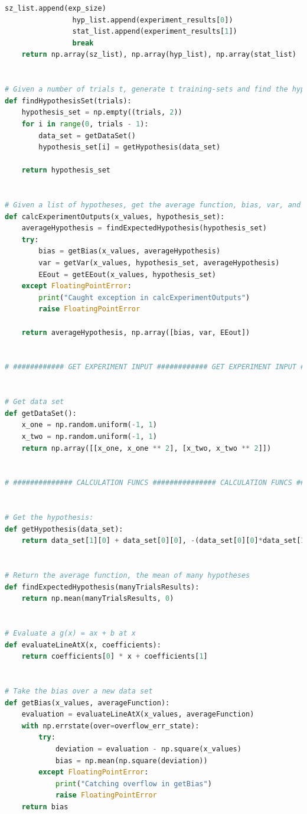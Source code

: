 \documentclass[12pt]{article}
\begin{document}
\begin{lstlisting}[language=Python, caption=experiement\_funcs.py]
                sz_list.append(exp_size)
                hyp_list.append(experiment_results[0])
                stat_list.append(experiment_results[1])
                break
    return np.array(sz_list), np.array(hyp_list), np.array(stat_list)


# Given a number of trials t, generate t training-sets and find the hypothesis for each one
def findHypothesisSet(trials):
    hypothesis_set = np.empty((trials, 2))
    for i in range(0, trials - 1):
        data_set = getDataSet()
        hypothesis_set[i] = getHypothesis(data_set)

    return hypothesis_set


# Given a list of hypotheses, get the average function, bias, var, and two versions of E[E_out]
def calcExperimentOutputs(x_values, hypothesis_set):
    averageHypothesis = findExpectedHypothesis(hypothesis_set)
    try:
        bias = getBias(x_values, averageHypothesis)
        var = getVar(x_values, hypothesis_set, averageHypothesis)
        EEout = getEEout(x_values, hypothesis_set)
    except FloatingPointError:
        print("Caught exception in calcExperimentOutputs")
        raise FloatingPointError

    return averageHypothesis, np.array([bias, var, EEout])


# ############ GET EXPERIMENT INPUT ############ GET EXPERIMENT INPUT ############# GET EXPERIMENT INPUT ############ #


# Get data set
def getDataSet():
    x_one = np.random.uniform(-1, 1)
    x_two = np.random.uniform(-1, 1)
    return np.array([[x_one, x_one ** 2], [x_two, x_two ** 2]])


# ############## CALCULATION FUNCS ############### CALCULATION FUNCS ############### CALCULATION FUNCS ############## #


# Get the hypothesis:
def getHypothesis(data_set):
    return data_set[1][0] + data_set[0][0], -(data_set[0][0]*data_set[1][0])


# Return the average function, the mean of many hypotheses
def findExpectedHypothesis(manyTrialsResults):
    return np.mean(manyTrialsResults, 0)


# Evaluate a g(x) = ax + b at x
def evaluateLineAtX(x, coefficients):
    return coefficients[0] * x + coefficients[1]


# Take the bias over a new data set
def getBias(x_values, averageFunction):
    evaluation = evaluateLineAtX(x_values, averageFunction)
    with np.errstate(over=overflow_err_state):
        try:
            deviation = evaluation - np.square(x_values)
            bias = np.mean(np.square(deviation))
        except FloatingPointError:
            print("Catching overflow in getBias")
            raise FloatingPointError
    return bias



\end{lstlisting}
\end{document}
